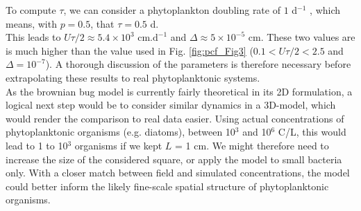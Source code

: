 To compute $\tau$, we can consider a phytoplankton doubling rate of $1$ d$^{-1}$ \citep{bissinger_predicting_2008}, which means, with $p=0.5$, that $\tau=0.5$ d.\\

This leads to $U\tau/2\approx 5.4\times10^{3} \text{ cm.d}^{-1}$ and $\Delta \approx 5\times10^{-5}$ cm. These two values are is much higher than the value used in Fig. \ref{fig:pcf_Fig3} ($0.1<U\tau/2<2.5$ and $\Delta=10^{-7}$). A thorough discussion of the parameters is therefore necessary before extrapolating these results to real phytoplanktonic systems. \\

As the brownian bug model is currently fairly theoretical in its 2D formulation, a logical next step would be to consider similar dynamics in a 3D-model, which would render the comparison to real data easier. Using actual concentrations of phytoplanktonic organisms (e.g. diatoms), between 10$^3$ and 10$^6$ C/L, this would lead to 1 to 10$^3$ organisms if we kept $L$ = 1 cm. We might therefore need to increase the size of the considered square, or apply the model to small bacteria only. With a closer match between field and simulated concentrations, the model could better inform the likely fine-scale spatial structure of phytoplanktonic organisms. 



